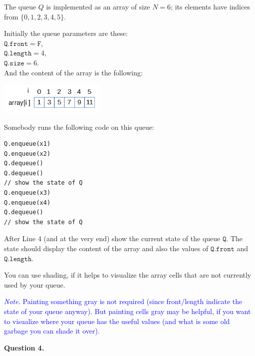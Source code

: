 \documentclass[a4paper,12pt]{article}
\begin{document}
The queue $Q$ is implemented as an array of size $N=6$; its elements
have indices from $\{0,1,2,3,4,5\}$. 

Initially the queue parameters are these:\\
$\mathtt{Q.front} = \mathtt{F}$,\\
$\mathtt{Q.length} = 4$,\\
$\mathtt{Q.size} = 6$.\\
And the content of the array is the following:

\includegraphics[width=2in]{midterm/midterm-queue-structure.png}

Somebody runs the following code on this queue:

\begin{verbatim}
Q.enqueue(x1)
Q.enqueue(x2)
Q.dequeue()
Q.dequeue()
// show the state of Q
Q.enqueue(x3)
Q.enqueue(x4)
Q.dequeue()
// show the state of Q
\end{verbatim}

After Line 4 (and at the very end) show the current state of the queue $\mathtt{Q}$. 
The state should display the content of the array and also the values of 
$\mathtt{Q.front}$ and $\mathtt{Q.length}$. 

You can use shading, if it helps to visualize the array cells that are not 
currently used by your queue.


\textcolor{blue}{\footnotesize
{\em Note.} Painting something gray is not required (since front/length indicate the state of your queue anyway). But painting cells gray may be helpful, if you want to visualize where your queue has the useful values (and what is some old garbage \textendash{} you can shade it over).
}


\vspace{20pt}
{\bf Question 4.} 
\end{document}
